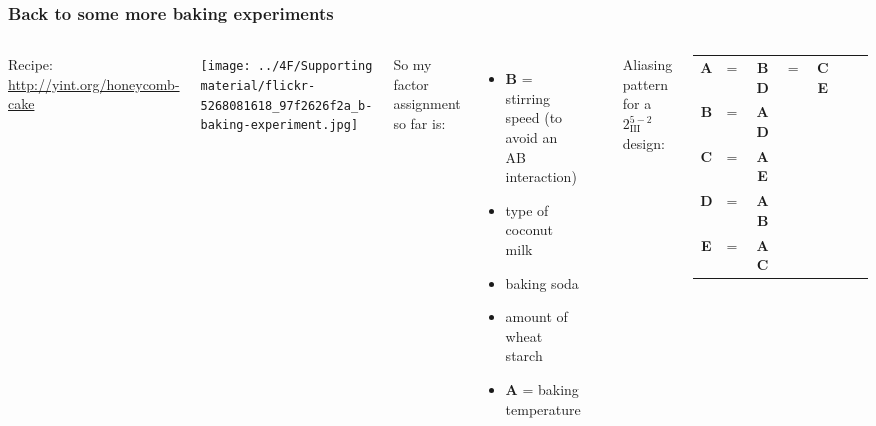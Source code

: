 \begin{frame}\frametitle{Back to some more baking experiments}
	\begin{columns}[T]
		
			\vspace{1cm}
			{\small Recipe: \href{http://yint.org/honeycomb-cake}{http://yint.org/honeycomb-cake}}
		
			\vspace{1cm}
		
			\centerline{\texttt{[image: ../4F/Supporting material/flickr-5268081618\_97f2626f2a\_b-baking-experiment.jpg]}}
			
		
			{\color{myOrange}So my factor assignment so far is:}
			\begin{itemize}
				\item	\textbf{B} = stirring speed {\tiny (to avoid an AB interaction)}
				\item	type of coconut milk
				\item	baking soda
				\item	amount of wheat starch
				\item	\textbf{A} = baking temperature
			\end{itemize}
			
			\vspace{0.4cm}
			\hrule
			
			\vspace{0.1cm}
			Aliasing pattern for a $2^{5-2}_{\textrm{III}}$ design:
			\begin{tabulary}{\linewidth}{ccccccc}				
				\textbf{A} & = & \textbf{BD} & = & \textbf{CE}  \\
				\textbf{B} & = & \textbf{AD} &  & \\
				\textbf{C} & = & \textbf{AE} &  & \\
				\textbf{D} & = & \textbf{AB} &  & \\
				\textbf{E} & = & \textbf{AC} &  & 
			\end{tabulary}
			
	\end{columns}
	
	\vspace{1cm}

	
\end{frame}

